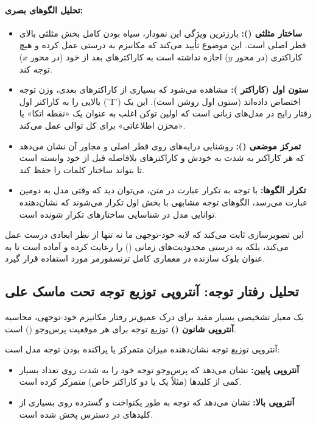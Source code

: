 \documentclass{article}
\begin{document}
\paragraph{تحلیل الگوهای بصری:}
\begin{itemize}
	\item \textbf{ساختار مثلثی ():} بارزترین ویژگی این نمودار، سیاه بودن کامل بخش مثلثی بالای قطر اصلی است. این موضوع تأیید می‌کند که مکانیزم  به درستی عمل کرده و هیچ کاراکتری (در محور $y$) اجازه نداشته است به کاراکترهای بعد از خود (در محور $x$) توجه کند.
	\item \textbf{ستون اول (کاراکتر ):} مشاهده می‌شود که بسیاری از کاراکترهای بعدی، وزن توجه بالایی را به کاراکتر اول ('T') اختصاص داده‌اند (ستون اول روشن است). این یک رفتار رایج در مدل‌های زبانی است که اولین توکن اغلب به عنوان یک «نقطه اتکا» یا «مخزن اطلاعاتی» برای کل توالی عمل می‌کند.
	\item \textbf{تمرکز موضعی ():} روشنایی درایه‌های روی قطر اصلی و مجاور آن نشان می‌دهد که هر کاراکتر به شدت به خودش و کاراکترهای بلافاصله قبل از خود وابسته است تا بتواند ساختار کلمات را حفظ کند.
	\item \textbf{تکرار الگوها:} با توجه به تکرار عبارت  در متن، می‌توان دید که وقتی مدل به دومین عبارت  می‌رسد، الگوهای توجه مشابهی با بخش اول تکرار می‌شوند که نشان‌دهنده توانایی مدل در شناسایی ساختارهای تکرار شونده است.
\end{itemize}

این تصویرسازی ثابت می‌کند که لایه خود-توجهی ما نه تنها از نظر ابعادی درست عمل می‌کند، بلکه به درستی محدودیت‌های زمانی () را رعایت کرده و آماده است تا به عنوان بلوک سازنده در معماری کامل ترنسفورمر مورد استفاده قرار گیرد.

\subsection{تحلیل رفتار توجه: آنتروپی توزیع توجه تحت ماسک علی}

یک معیار تشخیصی بسیار مفید برای درک عمیق‌تر رفتار مکانیزم خود-توجهی، محاسبه \textbf{آنتروپی شانون ()} توزیع توجه برای هر موقعیت پرس‌وجو () است. 

آنتروپی توزیع توجه نشان‌دهنده میزان متمرکز یا پراکنده بودن توجه مدل است:
\begin{itemize}
	\item \textbf{آنتروپی پایین:} نشان می‌دهد که پرس‌وجو توجه خود را به شدت روی تعداد بسیار کمی از کلیدها (مثلاً یک یا دو کاراکتر خاص) متمرکز کرده است.
	\item \textbf{آنتروپی بالا:} نشان می‌دهد که توجه به طور یکنواخت و گسترده روی بسیاری از کلیدهای در دسترس پخش شده است.
\end{itemize}
\end{document}
